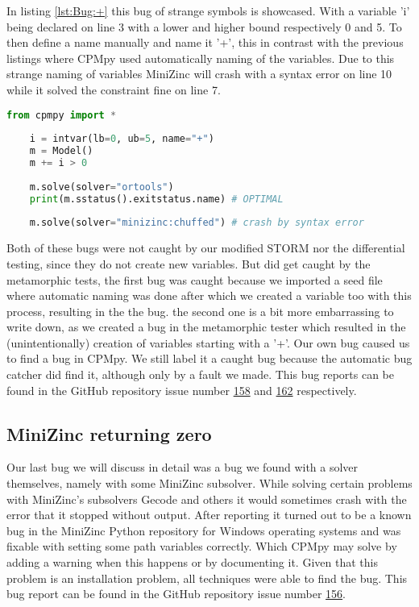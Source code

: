 In listing \ref{lst:Bug:+} this bug of strange symbols is showcased. With a variable 'i' being declared on line 3 with a lower and higher bound respectively 0 and 5. To then define a name manually and name it '+', this in contrast with the previous listings where CPMpy used automatically naming of the variables.  Due to this strange naming of variables MiniZinc will crash with a syntax error on line 10 while it solved the constraint fine on line 7.

\label{lst:Bug:+}
\begin{lstlisting}[language=python, caption={A bug showcasing that the naming of CPMpy is looser then MiniZinc.}]
	from cpmpy import *
	
	i = intvar(lb=0, ub=5, name="+")
	m = Model()
	m += i > 0
	
	m.solve(solver="ortools")
	print(m.sstatus().exitstatus.name) # OPTIMAL
	
	m.solve(solver="minizinc:chuffed") # crash by syntax error
\end{lstlisting}

Both of these bugs were not caught by our modified STORM nor the differential testing, since they do not create new variables. But did get caught by the metamorphic tests, the first bug was caught because we imported a seed file where automatic naming was done after which we created a variable too with this process, resulting in the the bug. the second one is a bit more embarrassing to write down, as we created a bug in the metamorphic tester which resulted in the (unintentionally) creation of variables starting with a '+'. Our own bug caused us to find a bug in CPMpy. We still label it a caught bug because the automatic bug catcher did find it, although only by a fault we made. This bug reports can be found in the GitHub repository issue number \href{https://github.com/CPMpy/cpmpy/issues/158}{158} and \href{https://github.com/CPMpy/cpmpy/issues/162}{162} respectively.


\subsection{MiniZinc returning zero}
\label{res:bug:MinizincZero}
Our last bug we will discuss in detail was a bug we found with a solver themselves, namely with some MiniZinc subsolver. While solving certain problems with MiniZinc's subsolvers Gecode and others it would sometimes crash with the error that it stopped without output. After reporting it turned out to be a known bug in the MiniZinc Python repository for Windows operating systems and was fixable with setting some path variables correctly. Which CPMpy may solve by adding a warning when this happens or by documenting it.
Given that this problem is an installation problem, all techniques were able to find the bug. This bug report can be found in the GitHub repository issue number \href{https://github.com/CPMpy/cpmpy/issues/156}{156}.

